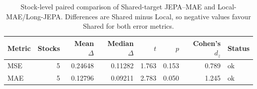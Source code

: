 \begin{table}[t]
\centering
\small
\caption{Stock-level paired comparison of Shared-target JEPA--MAE and Local-MAE/Long-JEPA. Differences are Shared minus Local, so negative values favour Shared for both error metrics.}
\label{tab:shared_vs_local}
\begin{tabular}{lrrrrrrl}
\toprule
Metric & Stocks & Mean $\Delta$ & Median $\Delta$ & $t$ & $p$ & Cohen's $d_z$ & Status \\
\midrule
MSE & 5 & 0.24648 & 0.11282 & 1.763 & 0.153 & 0.789 & ok \\
MAE & 5 & 0.12796 & 0.09211 & 2.783 & 0.050 & 1.245 & ok \\
\bottomrule
\end{tabular}
\end{table}
